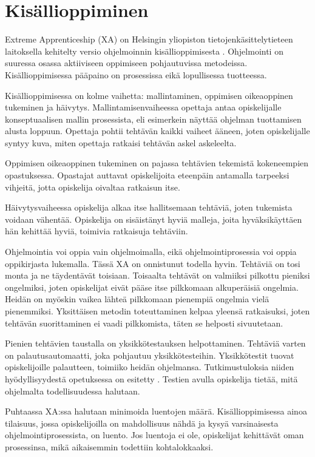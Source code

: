 \section{Kisällioppiminen}

Extreme Apprenticeship (XA) on Helsingin yliopiston tietojenkäsittelytieteen
laitoksella kehitelty versio ohjelmoinnin kisällioppimisesta
\cite{Vihavainen:2011:EAM:1953163.1953196}. Ohjelmointi on suuressa osassa
aktiiviseen oppimiseen pohjautuvissa metodeissa. Kisällioppimisessa pääpaino on
prosessissa eikä lopullisessa tuotteessa.

Kisällioppimisessa on kolme vaihetta: mallintaminen, oppimisen oikeaoppinen
tukeminen ja häivytys. Mallintamisenvaiheessa opettaja antaa opiskelijalle
konseptuaalisen mallin prosessista, eli esimerkein näyttää ohjelman tuottamisen
alusta loppuun. Opettaja pohtii tehtävän kaikki vaiheet ääneen, joten
opiskelijalle syntyy kuva, miten opettaja ratkaisi tehtävän askel askeleelta.

Oppimisen oikeaoppinen tukeminen on pajassa tehtävien tekemistä kokeneempien
opastuksessa. Opastajat auttavat opiskelijoita eteenpäin antamalla tarpeeksi
vihjeitä, jotta opiskelija oivaltaa ratkaisun itse.

Häivytysvaiheessa opiskelija alkaa itse hallitsemaan tehtäviä, joten tukemista
voidaan vähentää. Opiskelija on sisäistänyt hyviä malleja, joita hyväksikäyttäen
hän kehittää hyviä, toimivia ratkaisuja tehtäviin.

Ohjelmointia voi oppia vain ohjelmoimalla, eikä ohjelmointiprosessia voi oppia
oppikirjasta lukemalla. Tässä XA on onnistunut todella hyvin. Tehtäviä on tosi
monta ja ne täydentävät toisiaan. Toisaalta tehtävät on valmiiksi pilkottu
pieniksi ongelmiksi, joten opiskelijat eivät pääse itse pilkkomaan alkuperäisiä
ongelmia. Heidän on myöskin vaikea lähteä pilkkomaan pienempiä ongelmia vielä
pienemmiksi. Yksittäisen metodin toteuttaminen kelpaa yleensä ratkaisuksi, joten
tehtävän suorittaminen ei vaadi pilkkomista, täten se helposti sivuutetaan.

Pienien tehtävien taustalla on yksikkötestauksen helpottaminen. Tehtäviä varten
on palautusautomaatti, joka pohjautuu yksikkötesteihin. Yksikkötestit tuovat
opiskelijoille palautteen, toimiiko heidän ohjelmansa. Tutkimustuloksia niiden
hyödyllisyydestä opetuksessa on esitetty \cite{Bennedsen:2008}. Testien avulla
opiskelija tietää, mitä ohjelmalta todellisuudessa halutaan.

Puhtaassa XA:ssa halutaan minimoida luentojen määrä. Kisällioppimisessa ainoa
tilaisuus, jossa opiskelijoilla on mahdollisuus nähdä ja kysyä varsinaisesta
ohjelmointiprosessista, on luento. Jos luentoja ei ole, opiskelijat kehittävät
oman prosessinsa, mikä aikaisemmin todettiin kohtalokkaaksi.

